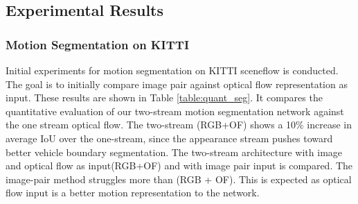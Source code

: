\documentclass[letterpaper, 10 pt, conference]{ieeeconf}  %
\begin{document}
\subsection{Experimental Results}\subsubsection{Motion Segmentation on KITTI}
 Initial experiments for motion segmentation on KITTI sceneflow is conducted. The goal is to initially compare image pair against optical flow representation as input. These results are shown in Table \ref{table:quant_seg}. It compares the quantitative evaluation of our two-stream motion segmentation network against the one stream optical flow. The two-stream (RGB+OF) shows a 10\% increase in average IoU over the one-stream, since the appearance stream pushes toward better vehicle boundary segmentation. The two-stream architecture with image and optical flow as input(RGB+OF) and with image pair input is compared.  The image-pair method struggles more than (RGB + OF). This is expected as optical flow input is a better motion representation to the network. 
\end{document}
